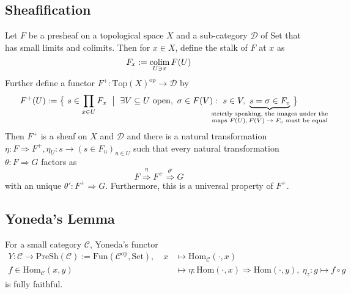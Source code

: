 \subsection{Sheafification}
Let $F$ be a presheaf on a topological space $X$ and a sub-category $\mathcal{D}$ of Set that has small limits and colimits.
Then for $x \in X$, define the stalk of $F$ at $x$ as
\begin{equation*}
    F_x := \operatorname*{colim}_{U \ni x} F(U)
\end{equation*}
Further define a functor $F^+: \mathrm{Top}(X)^{\mathrm{op}} \to \mathcal{D}$ by
\begin{align*}
    F^+(U) := \bigl\{ \ s \in \prod_{x \in U} F_x \ \bigm| \ \exists V \subseteq U \ \text{open}, \ \sigma \in F(V): \ s \in V, \ \underbrace{s = \sigma \in F_v}_{\mathclap{\substack{\text{strictly speaking, the images under the}\\\text{maps $F(U), F(V) \to F_v$ must be equal}}}} \ \bigr\}
\end{align*}
Then $F^+$ is a sheaf on $X$ and $\mathcal{D}$ and there is a natural transformation $\eta: F \Rightarrow F^+, \eta_U: s \to (s \in F_u)_{u \in U}$ such that every natural transformation $\theta: F \Rightarrow G$ factors as
\begin{equation*}
    F \overset{\eta}{\Rightarrow} F^+ \overset{\theta'}{\Rightarrow} G
\end{equation*}
with an unique $\theta': F^+ \Rightarrow G$.
Furthermore, this is a universal property of $F^+$.

\subsection{Yoneda's Lemma}
For a small category $\mathcal{C}$, Yoneda's functor
\begin{align*}
    Y: \mathcal{C} \to \mathrm{PreSh}(\mathcal{C}) := \mathrm{Fun}(\mathcal{C}^{\mathrm{op}}, \mathrm{Set}), \quad x &\mapsto \mathrm{Hom}_{\mathcal{C}}(\cdot, x) \\
    f \in \mathrm{Hom}_{\mathcal{C}}(x, y) &\mapsto \eta: \mathrm{Hom}(\cdot, x) \Rightarrow \mathrm{Hom}(\cdot, y), \ \eta_z: g \mapsto f \circ g
\end{align*}
is fully faithful.

